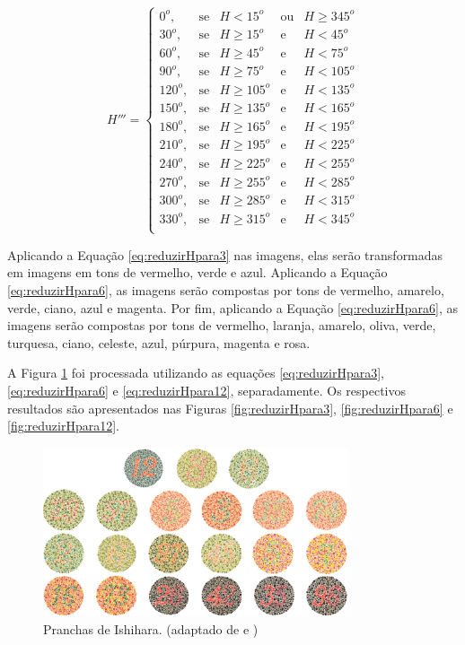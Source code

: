 \documentclass[	12pt, Times, openright, twoside, a4paper, english, brazil]{abntex2}
\begin{document}
\begin{equation}
\label{eq:reduzirHpara12}
H'''=\left\{
\begin{array}{rclcl}
    0^o,    &\mbox{se}  & H <15^o       & \mbox{ou} & H \geq 345^o \\
    30^o,   &\mbox{se}  & H \geq 15^o   & \mbox{e}  & H < 45^o \\
    60^o,   &\mbox{se}  & H \geq 45^o   & \mbox{e}  & H < 75^o \\
    90^o,   &\mbox{se}  & H \geq 75^o   & \mbox{e}  & H < 105^o \\
    120^o,  &\mbox{se}  & H \geq 105^o  & \mbox{e}  & H < 135^o \\
    150^o,  &\mbox{se}  & H \geq 135^o  & \mbox{e}  & H < 165^o \\
    180^o,  &\mbox{se}  & H \geq 165^o  & \mbox{e}  & H < 195^o \\
    210^o,  &\mbox{se}  & H \geq 195^o  & \mbox{e}  & H < 225^o \\
    240^o,  &\mbox{se}  & H \geq 225^o  & \mbox{e}  & H < 255^o \\
    270^o,  &\mbox{se}  & H \geq 255^o  & \mbox{e}  & H < 285^o \\
    300^o,  &\mbox{se}  & H \geq 285^o  & \mbox{e}  & H < 315^o \\
    330^o,  &\mbox{se}  & H \geq 315^o  & \mbox{e}  & H < 345^o \\
\end{array}\right.
\end{equation}

Aplicando a Equação \ref{eq:reduzirHpara3} nas imagens, elas serão transformadas em imagens em tons de vermelho, verde e azul. Aplicando a Equação \ref{eq:reduzirHpara6}, as imagens serão compostas por tons de vermelho, amarelo, verde, ciano, azul e magenta. Por fim, aplicando a Equação \ref{eq:reduzirHpara6}, as imagens serão compostas por tons de vermelho, laranja, amarelo, oliva, verde, turquesa, ciano, celeste, azul, púrpura, magenta e rosa.

A Figura \ref{fig:platesIshihara} foi processada utilizando as equações \ref{eq:reduzirHpara3}, \ref{eq:reduzirHpara6} e \ref{eq:reduzirHpara12}, separadamente. Os respectivos resultados são apresentados nas Figuras \ref{fig:reduzirHpara3}, \ref{fig:reduzirHpara6} e \ref{fig:reduzirHpara12}.

\begin{figure}[!htb]
\centering \includegraphics[width=0.80\textwidth]{platesIshihara.png}
\caption{Pranchas de Ishihara. (adaptado de  e ) \label{fig:platesIshihara}}
\end{figure}
\end{document}
